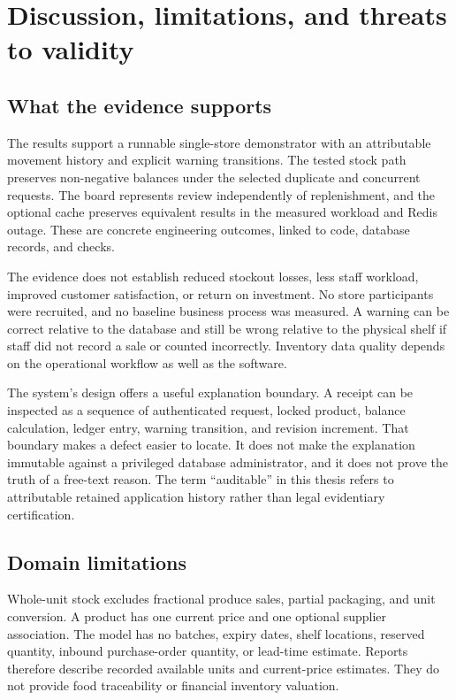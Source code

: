 \chapter{Discussion, limitations, and threats to validity}\label{ch:discussion}
\section{What the evidence supports}
The results support a runnable single-store demonstrator with an attributable movement history and explicit warning transitions. The tested stock path preserves non-negative balances under the selected duplicate and concurrent requests. The board represents review independently of replenishment, and the optional cache preserves equivalent results in the measured workload and Redis outage. These are concrete engineering outcomes, linked to code, database records, and checks.

The evidence does not establish reduced stockout losses, less staff workload, improved customer satisfaction, or return on investment. No store participants were recruited, and no baseline business process was measured. A warning can be correct relative to the database and still be wrong relative to the physical shelf if staff did not record a sale or counted incorrectly. Inventory data quality depends on the operational workflow as well as the software.

The system's design offers a useful explanation boundary. A receipt can be inspected as a sequence of authenticated request, locked product, balance calculation, ledger entry, warning transition, and revision increment. That boundary makes a defect easier to locate. It does not make the explanation immutable against a privileged database administrator, and it does not prove the truth of a free-text reason. The term ``auditable'' in this thesis refers to attributable retained application history rather than legal evidentiary certification.

\section{Domain limitations}
Whole-unit stock excludes fractional produce sales, partial packaging, and unit conversion. A product has one current price and one optional supplier association. The model has no batches, expiry dates, shelf locations, reserved quantity, inbound purchase-order quantity, or lead-time estimate. Reports therefore describe recorded available units and current-price estimates. They do not provide food traceability or financial inventory valuation.

